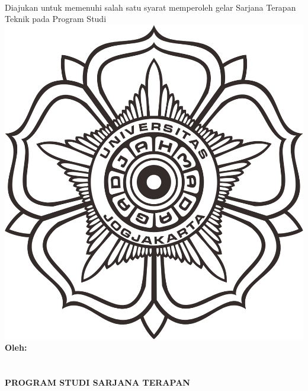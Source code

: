 \begin{titlepage}
    \begin{center}

        \begin{doublespace}
            \textbf{\MakeUppercase{\large{\tipe}}}\\[0.5cm]\textbf{\MakeUppercase{\large{\judulid}}}\\[0.75cm]
            
            \textbf{\MakeUppercase{\large{\judulen}}}\\[1cm]
        \end{doublespace}
        Diajukan untuk memenuhi salah satu syarat memperoleh gelar Sarjana Terapan Teknik pada Program Studi {\prodi} {\departemen} {\fakultas} {\universitas}\\[2cm]
        
        \includegraphics[width=0.35\linewidth]{gambar/logo-ugm.png}\\[1cm]

        \textbf{\large {Oleh:}} \\
        \textbf{\large \MakeUppercase{\underline{\penulis}}} \\
        \textbf{\large \MakeUppercase{{\nim}}} \\[1cm]


        \textbf{\large \MakeUppercase{Program Studi Sarjana Terapan \prodi}}\\
        \textbf{\large \MakeUppercase{\departemen}}\\
        \textbf{\large \MakeUppercase{\fakultas}}\\
        \textbf{\large \MakeUppercase{\universitas}}\\
        \textbf{\large \the\year{}}\\
    \end{center}
\end{titlepage}